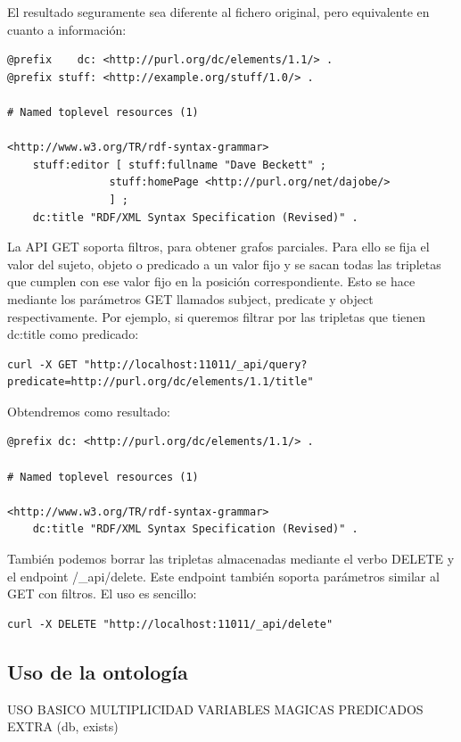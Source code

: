 \documentclass[12pt]{report} %
\begin{document}
El resultado seguramente sea diferente al fichero original, pero equivalente en cuanto a información:
\begin{verbatim}                                                 
@prefix    dc: <http://purl.org/dc/elements/1.1/> .
@prefix stuff: <http://example.org/stuff/1.0/> .

# Named toplevel resources (1)

<http://www.w3.org/TR/rdf-syntax-grammar>
    stuff:editor [ stuff:fullname "Dave Beckett" ;
                stuff:homePage <http://purl.org/net/dajobe/>
                ] ;
    dc:title "RDF/XML Syntax Specification (Revised)" .
\end{verbatim}

La API GET soporta filtros, para obtener grafos parciales. Para ello se fija el valor del sujeto, objeto o predicado a un valor fijo y se sacan todas las tripletas que cumplen con ese valor fijo en la posición correspondiente. Esto se hace mediante los parámetros GET llamados subject, predicate y object respectivamente. Por ejemplo, si queremos filtrar por las tripletas que tienen dc:title como predicado:

\begin{verbatim}
curl -X GET "http://localhost:11011/_api/query?predicate=http://purl.org/dc/elements/1.1/title"
\end{verbatim}

Obtendremos como resultado:
\begin{verbatim}
@prefix dc: <http://purl.org/dc/elements/1.1/> .

# Named toplevel resources (1)

<http://www.w3.org/TR/rdf-syntax-grammar>
    dc:title "RDF/XML Syntax Specification (Revised)" .
\end{verbatim}

También podemos borrar las tripletas almacenadas mediante el verbo DELETE y el endpoint /\_api/delete. Este endpoint también soporta parámetros similar al GET con filtros. El uso es sencillo:

\begin{verbatim}
curl -X DELETE "http://localhost:11011/_api/delete"
\end{verbatim}

\subsection{Uso de la ontología}

USO BASICO
MULTIPLICIDAD
VARIABLES MAGICAS
PREDICADOS EXTRA (db, exists)
\end{document}
